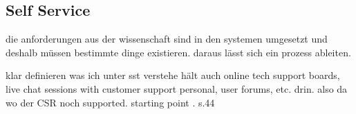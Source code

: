 	
	 
	\subsection{Self Service}
	
	die anforderungen aus der wissenschaft sind in den systemen umgesetzt und deshalb müssen bestimmte dinge existieren. daraus lässt sich ein prozess ableiten. 
	
	klar definieren was ich unter sst verstehe \citep{Thomas:2009} hält auch online tech support boards, live chat sessions with customer support personal, user forums, etc. drin. also da wo der CSR noch supported. 
	starting point \citep{Thomas:2009}.
		\citep{ccn2016} s.44
		
		
